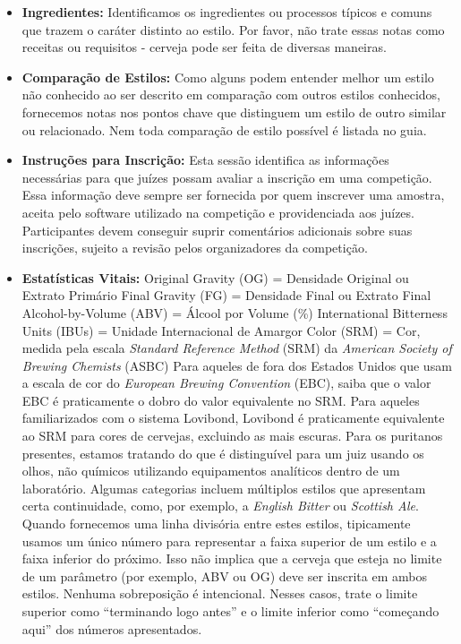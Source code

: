 \begin{itemize}
\item \textbf{Ingredientes:} Identificamos os ingredientes ou processos típicos e comuns que trazem o caráter distinto ao estilo. Por favor, não trate essas notas como receitas ou requisitos - cerveja pode ser feita de diversas maneiras.
\item \textbf{Comparação de Estilos:} Como alguns podem entender melhor um estilo não conhecido ao ser descrito em comparação com outros estilos conhecidos, fornecemos notas nos pontos chave que distinguem um estilo de outro similar ou relacionado. Nem toda comparação de estilo possível é listada no guia.
\item \textbf{Instruções para Inscrição:} Esta sessão identifica as informações necessárias para que juízes possam avaliar a inscrição em uma competição. Essa informação deve sempre ser fornecida por quem inscrever uma amostra, aceita pelo software utilizado na competição e providenciada aos juízes. Participantes devem conseguir suprir comentários adicionais sobre suas inscrições, sujeito a revisão pelos organizadores da competição.
\item \textbf{Estatísticas Vitais:}
Original Gravity (OG) = Densidade Original ou Extrato Primário
Final Gravity (FG) = Densidade Final ou Extrato Final
Alcohol-by-Volume (ABV) = Álcool por Volume (\%)
International Bitterness Units (IBUs) = Unidade Internacional de Amargor
Color (SRM) = Cor, medida pela escala \textit{Standard Reference Method} (SRM) da \textit{American Society of Brewing Chemists} (ASBC)
Para aqueles de fora dos Estados Unidos que usam a escala de cor do \textit{European Brewing Convention} (EBC), saiba que o valor EBC é praticamente o dobro do valor equivalente no SRM. Para aqueles familiarizados com o sistema Lovibond, Lovibond é praticamente equivalente ao SRM para cores de cervejas, excluindo as mais escuras. Para os puritanos presentes, estamos tratando do que é distinguível para um juiz usando os olhos, não químicos utilizando equipamentos analíticos dentro de um laboratório.
Algumas categorias incluem múltiplos estilos que apresentam certa continuidade, como, por exemplo, a \textit{English Bitter} ou \textit{Scottish Ale}. Quando fornecemos uma linha divisória entre estes estilos, tipicamente usamos um único número para representar a faixa superior de um estilo e a faixa inferior do próximo. Isso não implica que a cerveja que esteja no limite de um parâmetro (por exemplo, ABV ou OG) deve ser inscrita em ambos estilos. Nenhuma sobreposição é intencional. Nesses casos, trate o limite superior como “terminando logo antes” e o limite inferior como “começando aqui” dos números apresentados.

\end{itemize}
